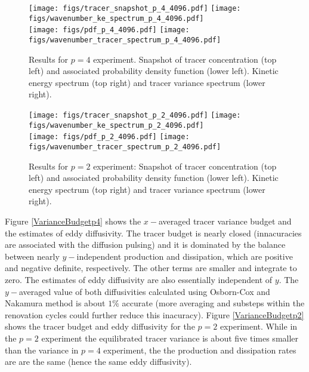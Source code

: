 \documentclass[11pt]{article}
\begin{document}
\begin{figure}[ht]
    \centering
       \texttt{[image: figs/tracer\_snapshot\_p\_4\_4096.pdf]}
       \texttt{[image: figs/wavenumber\_ke\_spectrum\_p\_4\_4096.pdf]}\\
         \texttt{[image: figs/pdf\_p\_4\_4096.pdf]}
       \texttt{[image: figs/wavenumber\_tracer\_spectrum\_p\_4\_4096.pdf]}
       \caption{\small Results for $p=4$ experiment. Snapshot of tracer concentration (top left)  and associated
       			probability density function (lower left). Kinetic energy spectrum (top right) and 
			tracer variance spectrum (lower right).}
		    \label{Resultsp4}
\end{figure}



\begin{figure}[ht]
    \centering
       \texttt{[image: figs/tracer\_snapshot\_p\_2\_4096.pdf]}
       \texttt{[image: figs/wavenumber\_ke\_spectrum\_p\_2\_4096.pdf]}\\
         \texttt{[image: figs/pdf\_p\_2\_4096.pdf]}
       \texttt{[image: figs/wavenumber\_tracer\_spectrum\_p\_2\_4096.pdf]}
       \caption{\small Results for $p=2$ experiment: Snapshot of tracer concentration (top left)  and associated
       			probability density function (lower left). Kinetic energy spectrum (top right) and 
			tracer variance spectrum (lower right).}
		    \label{Resultsp2}
\end{figure}

Figure \eqref{VarianceBudgetp4} shows the $x-$averaged tracer variance budget and the estimates of eddy diffusivity.
The tracer budget is nearly closed (innacuracies are associated with the diffusion pulsing) and it is dominated by the 
balance between nearly $y-$independent production and dissipation, which are positive and negative definite, respectively. The other terms are smaller and integrate to zero. The estimates of eddy diffusivity are also essentially independent of $y$. The $y-$averaged value of both diffusivities calculated using Osborn-Cox and Nakamura method is about $1\%$ accurate (more averaging and substeps within the renovation cycles could further reduce this inacuracy). Figure \ref{VarianceBudgetp2} shows the tracer budget and eddy diffusivity for the $p=2$ experiment. While in the $p=2$ experiment the equilibrated tracer variance is about five times smaller than the variance in $p=4$ experiment, the the production and dissipation rates are are the same (hence the same eddy diffusivity).
\end{document}
